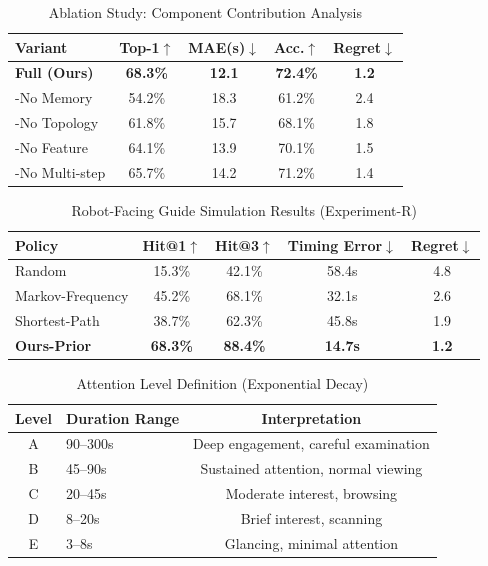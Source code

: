 \begin{table}[h]
\centering
\caption{Ablation Study: Component Contribution Analysis}
\begin{tabular}{lcccc}
\toprule
\textbf{Variant} & \textbf{Top-1$\uparrow$} & \textbf{MAE(s)$\downarrow$} & \textbf{Acc.$\uparrow$} & \textbf{Regret$\downarrow$} \\
\midrule
\textbf{Full (Ours)} & \textbf{68.3\%} & \textbf{12.1} & \textbf{72.4\%} & \textbf{1.2} \\
-No Memory & 54.2\% & 18.3 & 61.2\% & 2.4 \\
-No Topology & 61.8\% & 15.7 & 68.1\% & 1.8 \\
-No Feature & 64.1\% & 13.9 & 70.1\% & 1.5 \\
-No Multi-step & 65.7\% & 14.2 & 71.2\% & 1.4 \\
\bottomrule
\end{tabular}
\label{tab:ablation}
\end{table}

\begin{table}[h]
\centering
\caption{Robot-Facing Guide Simulation Results (Experiment-R)}
\begin{tabular}{lcccc}
\toprule
\textbf{Policy} & \textbf{Hit@1$\uparrow$} & \textbf{Hit@3$\uparrow$} & \textbf{Timing Error$\downarrow$} & \textbf{Regret$\downarrow$} \\
\midrule
Random & 15.3\% & 42.1\% & 58.4s & 4.8 \\
Markov-Frequency & 45.2\% & 68.1\% & 32.1s & 2.6 \\
Shortest-Path & 38.7\% & 62.3\% & 45.8s & 1.9 \\
\rowcolor{green!10}
\textbf{Ours-Prior} & \textbf{68.3\%} & \textbf{88.4\%} & \textbf{14.7s} & \textbf{1.2} \\
\bottomrule
\end{tabular}
\label{tab:robot_simulation}
\end{table}

\begin{table}[h]
\centering
\caption{Attention Level Definition (Exponential Decay)}
\begin{tabular}{clc}
\toprule
\textbf{Level} & \textbf{Duration Range} & \textbf{Interpretation} \\
\midrule
A & 90--300s & Deep engagement, careful examination \\
B & 45--90s & Sustained attention, normal viewing \\
C & 20--45s & Moderate interest, browsing \\
D & 8--20s & Brief interest, scanning \\
E & 3--8s & Glancing, minimal attention \\
\bottomrule
\end{tabular}
\label{tab:attention_levels}
\end{table}

